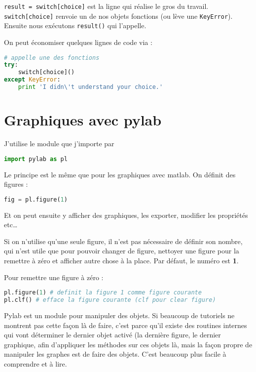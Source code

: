 \documentclass[a4paper,twoside]{article}
\begin{document}
\verb|result = switch[choice]| est la ligne qui réalise le gros du travail. \verb|switch[choice]| renvoie un de nos objets fonctions (ou lève une \verb|KeyError|). Ensuite nous exécutons \verb|result()| qui l’appelle.

On peut économiser quelques lignes de code via :
\begin{lstlisting}[language=python]
# appelle une des fonctions
try:
    switch[choice]()
except KeyError:
    print 'I didn\'t understand your choice.'
\end{lstlisting}



\section{Graphiques avec pylab}
J'utilise le module  que j'importe par
\begin{lstlisting}[language=python]
import pylab as pl
\end{lstlisting}

Le principe est le même que pour les graphiques avec matlab. On définit des figures :
\begin{lstlisting}[language=python]
fig = pl.figure(1)
\end{lstlisting}
Et on peut ensuite y afficher des graphiques, les exporter, modifier les propriétés etc\dots

\begin{remarque}
Si on n'utilise qu'une seule figure, il n'est pas nécessaire de définir son nombre, qui n'est utile que pour pouvoir changer de figure, nettoyer une figure pour la remettre à zéro et afficher autre chose à la place. Par défaut, le numéro est \textbf{1}.
\end{remarque}

Pour remettre une figure à zéro :
\begin{lstlisting}[language=python]
pl.figure(1) # definit la figure 1 comme figure courante
pl.clf() # efface la figure courante (clf pour clear figure)
\end{lstlisting}

\begin{attention}
Pylab est un module pour manipuler des objets. Si beaucoup de tutoriels ne montrent pas cette façon là de faire, c'est parce qu'il existe des routines internes qui vont déterminer le dernier objet activé (la dernière figure, le dernier graphique, afin d'appliquer les méthodes sur ces objets là, mais la façon propre de manipuler les graphes est de faire des objets. C'est beaucoup plus facile à comprendre et à lire.
\end{attention}
\end{document}
